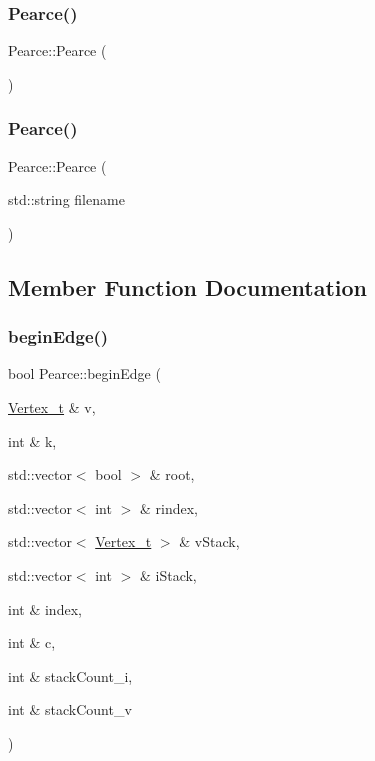 \subsubsection{\texorpdfstring{Pearce()}{Pearce()}\hspace{0.1cm}{\footnotesize\ttfamily [1/2]}}
{\footnotesize\ttfamily Pearce\+::\+Pearce (\begin{DoxyParamCaption}{ }\end{DoxyParamCaption})\hspace{0.3cm}{\ttfamily [default]}}

\mbox{\label{class_pearce_a0851b1b696528448c1a42dbb6b4e6c8f}} 
\subsubsection{\texorpdfstring{Pearce()}{Pearce()}\hspace{0.1cm}{\footnotesize\ttfamily [2/2]}}
{\footnotesize\ttfamily Pearce\+::\+Pearce (\begin{DoxyParamCaption}\item[{std\+::string}]{filename }\end{DoxyParamCaption})\hspace{0.3cm}{\ttfamily [inline]}}



\subsection{Member Function Documentation}
\mbox{\label{class_pearce_a6d6c641f1815e11536554077ed18c10e}} 
\subsubsection{\texorpdfstring{begin\+Edge()}{beginEdge()}}
{\footnotesize\ttfamily bool Pearce\+::begin\+Edge (\begin{DoxyParamCaption}\item[{\hyperlink{class_graph_component_ae67114a6ce5a001dc35e1996e1b45aa0}{Vertex\+\_\+t} \&}]{v,  }\item[{int \&}]{k,  }\item[{std\+::vector$<$ bool $>$ \&}]{root,  }\item[{std\+::vector$<$ int $>$ \&}]{rindex,  }\item[{std\+::vector$<$ \hyperlink{class_graph_component_ae67114a6ce5a001dc35e1996e1b45aa0}{Vertex\+\_\+t} $>$ \&}]{v\+Stack,  }\item[{std\+::vector$<$ int $>$ \&}]{i\+Stack,  }\item[{int \&}]{index,  }\item[{int \&}]{c,  }\item[{int \&}]{stack\+Count\+\_\+i,  }\item[{int \&}]{stack\+Count\+\_\+v }\end{DoxyParamCaption})}

